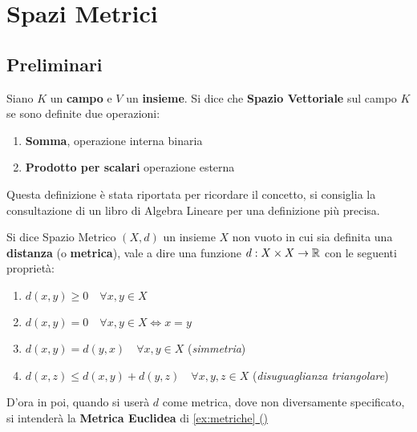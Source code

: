 \chapter{Spazi Metrici}

\section{Preliminari}

\begin{definition}
	Siano $K$ un \textbf{campo} e $V$ un \textbf{insieme}. Si dice che \textbf{Spazio Vettoriale} sul campo $K$ se sono definite due operazioni:
	\begin{enumerate}
		\item \textbf{Somma}, operazione interna binaria
		\item \textbf{Prodotto per scalari} operazione esterna
	\end{enumerate}
	\begin{note}
		Questa definizione è stata riportata per ricordare il concetto, si consiglia la consultazione di un libro di Algebra Lineare per una definizione più precisa.
	\end{note}
\end{definition}

\begin{definition}
	\label{def:sp_metrico}
	Si dice Spazio Metrico $(X,d)$ un insieme $X$ non vuoto in cui sia definita una \textbf{distanza} (o \textbf{metrica}), vale a dire una funzione $d: X \times X \to \mathbb{R}$ con le seguenti proprietà:
	\begin{enumerate}
		\item $d(x,y) \geq 0 \quad \forall x,y \in X$
		\item $d(x,y) = 0 \quad \forall x,y \in X \iff x=y$
		\item $d(x,y) = d(y,x) \quad \forall x,y \in X$ \quad(\textit{simmetria})
		\item $d(x,z) \leq d(x,y)+d(y,z) \quad \forall x,y,z\in X$ \quad(\textit{disuguaglianza triangolare})
	\end{enumerate}
	\begin{note}
		D'ora in poi, quando si userà $d$ come metrica, dove non diversamente specificato, si intenderà la \textbf{Metrica Euclidea} di \hyperref[ex:dist_eucl]{\cref*{ex:metriche} ()} %
	\end{note}
\end{definition}

